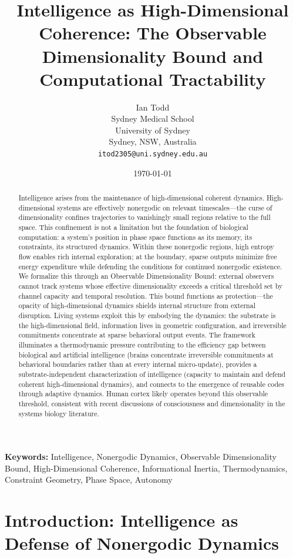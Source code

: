 \documentclass[12pt]{article}
\title{Intelligence as High-Dimensional Coherence: The Observable Dimensionality Bound and Computational Tractability}
\author{Ian Todd\\
Sydney Medical School\\
University of Sydney\\
Sydney, NSW, Australia\\
\texttt{itod2305@uni.sydney.edu.au}}
\date{\today}
\begin{document}
\maketitle

\begin{abstract}
Intelligence arises from the maintenance of high-dimensional coherent dynamics. High-dimensional systems are effectively nonergodic on relevant timescales---the curse of dimensionality confines trajectories to vanishingly small regions relative to the full space. This confinement is not a limitation but the foundation of biological computation: a system's position in phase space functions as its memory, its constraints, its structured dynamics. Within these nonergodic regions, high entropy flow enables rich internal exploration; at the boundary, sparse outputs minimize free energy expenditure while defending the conditions for continued nonergodic existence. We formalize this through an Observable Dimensionality Bound: external observers cannot track systems whose effective dimensionality exceeds a critical threshold set by channel capacity and temporal resolution. This bound functions as protection---the opacity of high-dimensional dynamics shields internal structure from external disruption. Living systems exploit this by embodying the dynamics: the substrate is the high-dimensional field, information lives in geometric configuration, and irreversible commitments concentrate at sparse behavioral output events. The framework illuminates a thermodynamic pressure contributing to the efficiency gap between biological and artificial intelligence (brains concentrate irreversible commitments at behavioral boundaries rather than at every internal micro-update), provides a substrate-independent characterization of intelligence (capacity to maintain and defend coherent high-dimensional dynamics), and connects to the emergence of reusable codes through adaptive dynamics. Human cortex likely operates beyond this observable threshold, consistent with recent discussions of consciousness and dimensionality in the systems biology literature.
\end{abstract}

\noindent\textbf{Keywords:} Intelligence, Nonergodic Dynamics, Observable Dimensionality Bound, High-Dimensional Coherence, Informational Inertia, Thermodynamics, Constraint Geometry, Phase Space, Autonomy

\section{Introduction: Intelligence as Defense of Nonergodic Dynamics}
\end{document}
